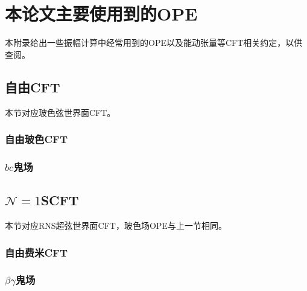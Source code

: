 
\chapter{本论文主要使用到的OPE}
\label{appendix:A}
本附录给出一些振幅计算中经常用到的OPE以及能动张量等CFT相关约定，以供查阅。
\section{自由CFT}
本节对应玻色弦世界面CFT。
\subsection{自由玻色CFT}

\subsection{$bc$鬼场}
\section{$\mathcal{N}=1$SCFT}
本节对应RNS超弦世界面CFT，玻色场OPE与上一节相同。
\subsection{自由费米CFT}

\subsection{$\beta\gamma$鬼场}

